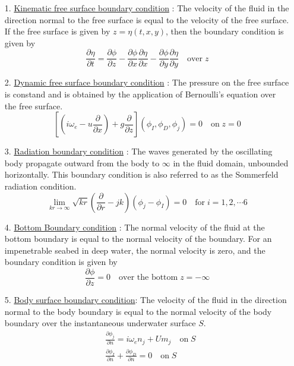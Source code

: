 \begin{itemize}
    \item[1.] \underline{Kinematic free surface boundary condition} : 
    The velocity of the fluid in the direction normal to the free surface is equal to the velocity of the free surface. If the free surface is given by $z = \eta(t, x, y)$, then the boundary condition is given by
    \begin{equation}
        \label{eq:kin_free_surface_cond}
        \frac{\partial \eta}{\partial t} = \frac{\partial \phi}{\partial z} - \frac{\partial \phi}{\partial x} \frac{\partial \eta}{\partial x} - \frac{\partial \phi}{\partial y}\frac{\partial \eta}{\partial y} \quad \text{over} \; z
    \end{equation}
    
    \item[2.] \underline{Dynamic free surface boundary condition} : 
    The pressure on the free surface is constand and is obtained by the application of Bernoulli's 
    equation over the free surface.
    \begin{equation}
        \label{eq:dyn_free_surface_cond}
        \left[\left(i\omega_e - u\frac{\partial}{\partial x}\right) + g\frac{\partial}{\partial z}\right](\phi_I, \phi_D, \phi_j) = 0 \quad \text{on} \; z = 0
    \end{equation}
    
    \item[3.] \underline{Radiation boundary condition} :
    The waves generated by the oscillating body propagate outward from the body to $\infty$ in the fluid domain, unbounded horizontally. This boundary condition is also referred to as the Sommerfeld radiation condition.
    \begin{equation}
        \label{eq:sommerfel_rad_cond}
        \lim_{kr\rightarrow \infty}\sqrt{kr}\left(\frac{\partial}{\partial r} -jk\right)(\phi_j - \phi_I) = 0 \quad \text{for}\; i = 1, 2, \cdots 6
    \end{equation}
    
    \item[4.] \underline{Bottom Boundary condition} :
    The normal velocity of the fluid at the bottom boundary is equal to the normal velocity of the boundary. For an impenetrable seabed in deep water, the normal velocity is zero, and the boundary condition is given by 
    \begin{equation}
        \frac{\partial \phi}{\partial z} = 0 \quad \text{over the bottom}\; z = -\infty
    \end{equation}
    \item[5.] \underline{Body surface boundary condition}:
    The velocity of the fluid in the direction normal to the body boundary is equal to the normal velocity of the body boundary over the instantaneous underwater surface $S$.
    \begin{align}
        \label{eq:body_surface_boundary_cond}
        &\frac{\partial \phi_j}{\partial n} = i\omega_e n_j + Um_j \quad \text{on}\; S \\
        \label{eq:radiation_boundary}
        &\frac{\partial \phi_I}{\partial n} + \frac{\partial \phi_D}{\partial n} = 0 \quad \text{on}\; S
    \end{align}
\end{itemize}
